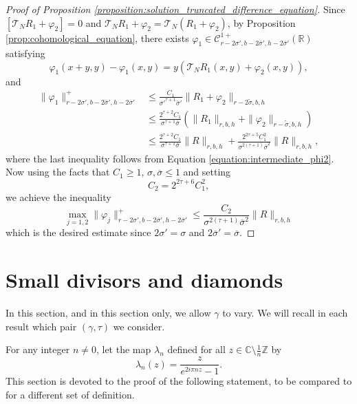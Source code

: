 \documentclass[10pt]{article}
\newcommand{\R}{\mathbb{R}}
\newcommand{\ZZ}{\mathbb{Z}}
\newcommand{\CC}{\mathbb{C}}
\begin{document}
\begin{proof}[Proof of Proposition \ref{proposition:solution_truncated_difference_equation}]
 Since $[\mathscr T_NR_1+\varphi_2] = 0$ and $\mathscr T_N R_1+\varphi_2 = \mathscr T_N(R_1+\varphi_2)$, by Proposition \ref{prop:cohomological_equation}, there exists $\varphi_1\in\mathscr C^{1+}_{r-2\sigma',b-2\overline\sigma',h-2\overline\sigma'}(\R)$ satisfying
 \[
 \varphi_1(x+y,y)-\varphi_1(x,y) = y(\mathscr T_N R_1(x, y)+\varphi_2(x, y)),
 \]
 and
\[
\begin{aligned}
 \|\varphi_1\|_{r-2\sigma',b-2\overline\sigma',h-2\overline\sigma'}^+ 
 &\leq \frac{C_1}{{\sigma'}^{\tau+1}{\overline\sigma'}}
 \|R_1+\varphi_2\|_{r-2\tilde\sigma,b,h} \\
 & \leq \frac{2^{\tau+2}C_1}{{\sigma}^{\tau+1}{\overline\sigma}}
 \left(\|R_1\|_{r,b,h}+\|\varphi_2\|_{r-\tilde\sigma,b,h}\right)\\
 & \leq \frac{2^{\tau+2}C_1}{{\sigma}^{\tau+1}{\overline\sigma}}
 \|R\|_{r,b,h}
 +\frac{2^{2\tau+5}C_1^2}{{\sigma}^{2(\tau+1)}{\overline\sigma}^2}
 \|R\|_{r,b,h},
 \end{aligned}
 \]
 where the last inequality follows from Equation \eqref{equation:intermediate_phi2}. Now using the facts that
 $C_1\geq 1$, $\sigma,\overline\sigma \leq 1$  
 and setting
 \[
 C_2 = 2^{2\tau+6}C_1^2, 
 \]
 we achieve the inequality
 \[
 \max_{j=1,2}\|\varphi_j\|_{r-2\sigma',b-2\overline\sigma',h-2\overline\sigma'}^+ \leq \frac{C_2}{{\sigma}^{2(\tau+1)}{\overline\sigma}^2}
 \|R\|_{r,b,h}
 \]
 which is the desired estimate since $2\sigma'=\sigma$ and $2\overline\sigma'=\overline\sigma$.
\end{proof}




\section{Small divisors and diamonds}

In this section, and in this section only, we allow $\gamma$ to vary. We will recall in each result which pair $(\gamma,\tau)$ we consider. 

For any integer $n\neq 0$, let the map $\lambda_n$ defined for all $z\in \CC\setminus\frac{1}{n}\ZZ$ by
\begin{equation}
 \label{equation:elementary_maps}
 \lambda_n(z) = \frac{z}{e^{2i\pi nz}-1}.
\end{equation}
This section is devoted to the proof of the following statement, to be compared to \cite[Proposition 6]{CMS} for a different set of definition.
\end{document}

